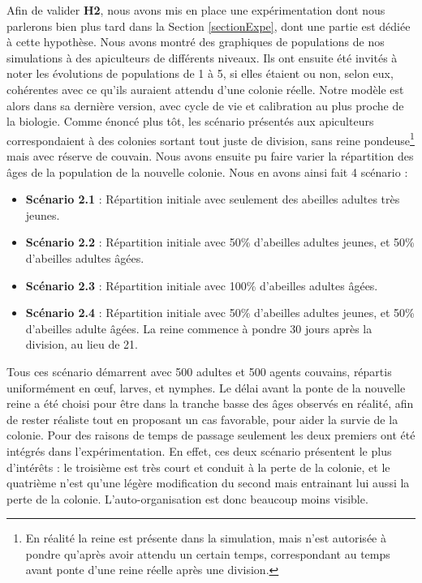 			Afin de valider \textbf{H2}, nous avons mis en place une expérimentation dont nous parlerons bien plus tard dans la Section \ref{sectionExpe}, dont une partie est dédiée à cette hypothèse. Nous avons montré des graphiques de populations de nos simulations à des apiculteurs de différents niveaux. Ils ont ensuite été invités à noter les évolutions de populations de 1 à 5, si elles étaient ou non, selon eux, cohérentes avec ce qu'ils auraient attendu d'une colonie réelle. Notre modèle est alors dans sa dernière version, avec cycle de vie et calibration au plus proche de la biologie. Comme énoncé plus tôt, les scénario présentés aux apiculteurs correspondaient à des colonies sortant tout juste de division, sans reine pondeuse\footnote{En réalité la reine est présente dans la simulation, mais n'est autorisée à pondre qu'après avoir attendu un certain temps, correspondant au temps avant ponte d'une reine réelle après une division.} mais avec réserve de couvain. Nous avons ensuite pu faire varier la répartition des âges de la population de la nouvelle colonie. Nous en avons ainsi fait 4 scénario :
				\begin{itemize}
					\item \textbf{Scénario 2.1} : Répartition initiale avec seulement des abeilles adultes très jeunes.
					\item \textbf{Scénario 2.2} : Répartition initiale avec 50\% d'abeilles adultes jeunes, et 50\% d'abeilles adultes âgées.
					\item \textbf{Scénario 2.3} : Répartition initiale avec 100\% d'abeilles adultes âgées.
					\item \textbf{Scénario 2.4} : Répartition initiale avec 50\% d'abeilles adultes jeunes, et 50\% d'abeilles adulte âgées. La reine commence à pondre 30 jours après la division, au lieu de 21.
				\end{itemize}
				
				Tous ces scénario démarrent avec 500 adultes et 500  agents couvains, répartis uniformément en œuf, larves, et nymphes.  Le délai avant la ponte de la nouvelle reine a été choisi pour être dans la tranche basse des âges observés en réalité, afin de rester réaliste tout en proposant un cas favorable, pour aider la survie de la colonie. Pour des raisons de temps de passage seulement les deux premiers ont été intégrés dans l'expérimentation. En effet, ces deux scénario présentent le plus d'intérêts : le troisième est très court et conduit à la perte de la colonie, et le quatrième n'est qu'une légère modification du second mais entrainant lui aussi la perte de la colonie. L'auto-organisation est donc beaucoup moins visible.
				

